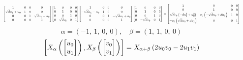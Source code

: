 \documentclass[11pt]{article}
\theoremstyle{definition}
\begin{document}
\[
\scaletoalign{\textwidth}{{\left[\begin{matrix}1 & 0 & 0 & 0\\\sqrt{d} u_{1} + u_{0} & 1 & 0 & 0\\0 & 0 & 1 & \sqrt{d} u_{1} - u_{0}\\0 & 0 & 0 & 1\end{matrix}\right]} {\left[\begin{matrix}1 & 0 & 0 & 0\\0 & 1 & 0 & 0\\0 & 0 & 1 & 0\\0 & \sqrt{d} v_{0} & 0 & 1\end{matrix}\right]} {\left[\begin{matrix}1 & 0 & 0 & 0\\- \sqrt{d} u_{1} - u_{0} & 1 & 0 & 0\\0 & 0 & 1 & - \sqrt{d} u_{1} + u_{0}\\0 & 0 & 0 & 1\end{matrix}\right]} {\left[\begin{matrix}1 & 0 & 0 & 0\\0 & 1 & 0 & 0\\0 & 0 & 1 & 0\\0 & - \sqrt{d} v_{0} & 0 & 1\end{matrix}\right]} = {\left[\begin{matrix}1 & 0 & 0 & 0\\0 & 1 & 0 & 0\\\sqrt{d} v_{0} \left(- d u_{1}^{2} + u_{0}^{2}\right) & v_{0} \left(- \sqrt{d} u_{0} + d u_{1}\right) & 1 & 0\\- v_{0} \left(\sqrt{d} u_{0} + d u_{1}\right) & 0 & 0 & 1\end{matrix}\right]}}
\]
\[
\alpha = \left( -1, \  1, \  0, \  0\right), \quad \beta = \left( 1, \  1, \  0, \  0\right)
\]
\[
\scaletoalign{\textwidth}{\left[ X_{\alpha}\left(\left[\begin{matrix}u_{0}\\u_{1}\end{matrix}\right]\right), X_{\beta}\left(\left[\begin{matrix}v_{0}\\v_{1}\end{matrix}\right]\right) \right] = X_{\alpha + \beta}\left(2 u_{0} v_{0} - 2 u_{1} v_{1}\right)}
\]
\end{document}
